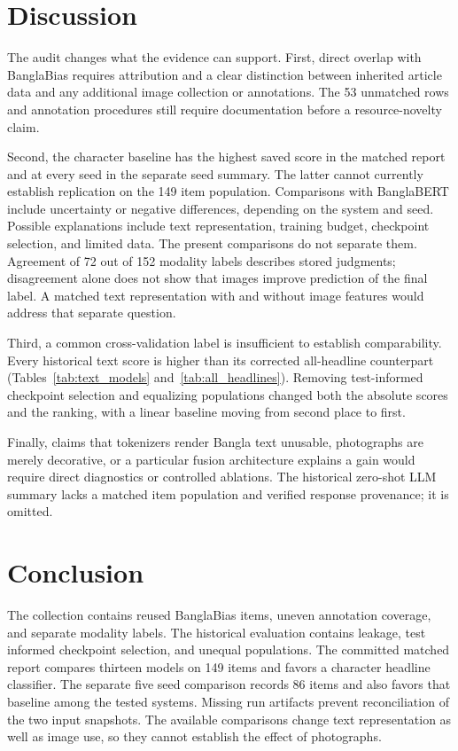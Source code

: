 \documentclass[11pt]{article}
\begin{document}
\section{Discussion}
The audit changes what the evidence can support. First, direct overlap with BanglaBias requires attribution and a clear distinction between inherited article data and any additional image collection or annotations. The 53 unmatched rows and annotation procedures still require documentation before a resource-novelty claim.

Second, the character baseline has the highest saved score in the matched report and at every seed in the separate seed summary. The latter cannot currently establish replication on the 149 item population. Comparisons with BanglaBERT include uncertainty or negative differences, depending on the system and seed. Possible explanations include text representation, training budget, checkpoint selection, and limited data. The present comparisons do not separate them. Agreement of 72 out of 152 modality labels describes stored judgments; disagreement alone does not show that images improve prediction of the final label. A matched text representation with and without image features would address that separate question. %

Third, a common cross-validation label is insufficient to establish comparability. Every historical text score is higher than its corrected all-headline counterpart (Tables~\ref{tab:text_models} and~\ref{tab:all_headlines}). Removing test-informed checkpoint selection and equalizing populations changed both the absolute scores and the ranking, with a linear baseline moving from second place to first.

Finally, claims that tokenizers render Bangla text unusable, photographs are merely decorative, or a particular fusion architecture explains a gain would require direct diagnostics or controlled ablations. The historical zero-shot LLM summary lacks a matched item population and verified response provenance; it is omitted.

\section{Conclusion}
The collection contains reused BanglaBias items, uneven annotation coverage, and separate modality labels. The historical evaluation contains leakage, test informed checkpoint selection, and unequal populations. The committed matched report compares thirteen models on 149 items and favors a character headline classifier. The separate five seed comparison records 86 items and also favors that baseline among the tested systems. Missing run artifacts prevent reconciliation of the two input snapshots. The available comparisons change text representation as well as image use, so they cannot establish the effect of photographs. %
\end{document}
